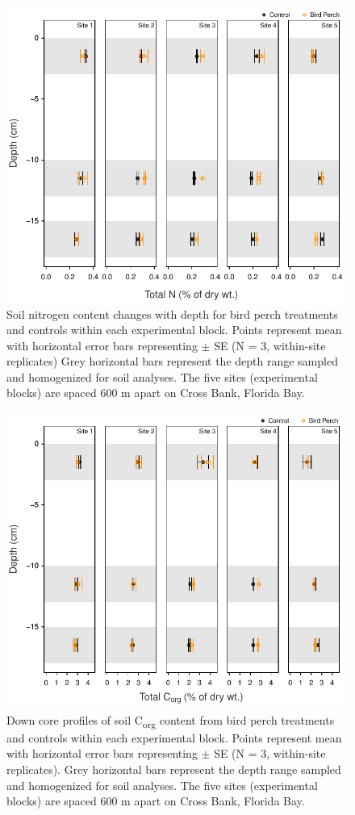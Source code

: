 \begin{figure}
  \centering
  \includegraphics[width=.9\textwidth]{Figures/chapter1/fig6}
\caption[Soil nitrogen content changes with depth]{Soil nitrogen content changes with depth for bird perch treatments and controls within each experimental block. Points represent mean with horizontal error bars representing $\pm$ SE (N = 3, within-site replicates) Grey horizontal bars represent the depth range sampled and homogenized for soil analyses. The five sites (experimental blocks) are spaced 600 m apart on Cross Bank, Florida Bay.}
  \label{fig:1fig6}
\end{figure}

\begin{figure}
  \centering
  \includegraphics[width=.9\textwidth]{Figures/chapter1/fig7}
\caption[Down core profiles of soil C\textsubscript{org} content across experimental blocks]{Down core profiles of soil C\textsubscript{org} content from bird perch treatments and controls within each experimental block. Points represent mean with horizontal error bars representing $\pm$ SE (N = 3, within-site replicates). Grey horizontal bars represent the depth range sampled and homogenized for soil analyses. The five sites (experimental blocks) are spaced 600 m apart on Cross Bank, Florida Bay.}
  \label{fig:1fig7}
\end{figure}

